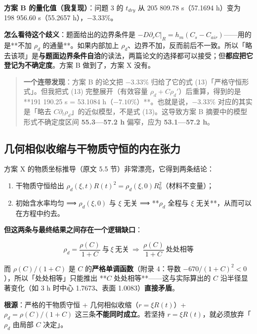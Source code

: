 \textbf{方案 B 的量化值（我复现）}：问题 3 的 $t_{dry}$ 从 205 809.78 s（57.1694 h）变为 198 956.60 s（55.2657 h），$−3.33\%$。


\textbf{怎么看待这个歧义}：题面给出的边界条件是 $-D\partial_rC|_R=h_m(C_s-C_{air})$——用的是**不加 $\rho_d$ 的通量**。如果内部加上 $\rho_d$、边界不加，反而前后不一致。所以「略去该项」是\textbf{与题面边界条件自洽}的读法，两篇论文的选择都可以接受；但\textbf{都应把它登记为不确定度}。方案 B 做到了，方案 X 没有。


\begin{quote}
\textbf{一个连带发现}：方案 B 的论文把 $-3.33\%$ 归给了它的式 (13)「严格守恒形式」。但我把式 (13) 完整展开（有效容量 $\rho_d+C\rho_d'$）后重算，得到的是 **191 190.25 s = 53.1084 h（$−7.10\%$）**。也就是说，$-3.33\%$ 对应的其实是「略去 $C\partial_t\rho_d$」的近似模型，不是式 (13)。这导致方案 B 摘要中的模型形式不确定度区间 \textbf{55.3—57.2 h} 偏窄，应为 \textbf{53.1—57.2 h}。
\end{quote}


\subsection{几何相似收缩与干物质守恒的内在张力}


方案 X 的物质坐标推导（原文 5.5 节）非常漂亮，它得到两条结论：


\begin{enumerate}
\item 干物质守恒给出 $\rho_d(\xi,t)R(t)^2=\rho_d(\xi,0)R_0^2$（材料不变量）；
\item 初始含水率均匀 ⟹ $\rho_d(\xi,0)$ 与 $\xi$ 无关 ⟹ **$\rho_d$ 全程与 $\xi$ 无关**，从而可以在方程中约去。
\end{enumerate}


\textbf{但这两条与最终结果之间存在一个逻辑缺口}：


\begin{equation*}
\rho_d=\frac{\rho(C)}{1+C}\ \text{与}\ \xi\ \text{无关}\ \Longrightarrow\ \frac{\rho(C)}{1+C}\ \text{处处相等}
\end{equation*}


而 $\rho(C)/(1+C)$ 是 $C$ 的\textbf{严格单调函数}（附录 4：导数 $-670/(1+C)^2<0$），所以「处处相等」只能推出 **$C$ 处处相等**——这与实际算出的 $C$ 沿半径显著变化（如 3 h 时中心 1.7673、表面 1.0083）\textbf{直接矛盾}。


\textbf{根源}：严格的干物质守恒 + 几何相似收缩（$r=\xi R(t)$）+ $\rho_d=\rho(C)/(1+C)$ 这三条\textbf{不能同时成立}。若坚持 $r=\xi R(t)$，就必须放弃「$\rho_d$ 由局部 $C$ 决定」。


